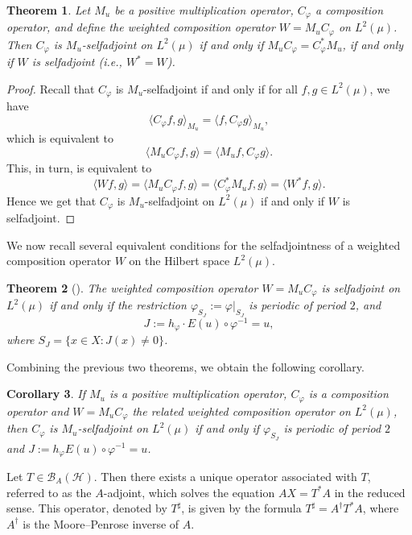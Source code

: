 \documentclass{amsart}
\newtheorem{thm}{Theorem}[section]
\newtheorem{cor}[thm]{Corollary}
\theoremstyle{definition}\newtheorem{defn}[thm]{Definition}
\theoremstyle{remark}
\numberwithin{equation}{section}
\begin{document}
\begin{thm}
Let $M_u$ be a positive multiplication operator, $C_{\varphi}$ a composition operator, and define the weighted composition operator $W = M_u C_{\varphi}$ on $L^2(\mu)$. Then $C_{\varphi}$ is $M_u$-selfadjoint on $L^2(\mu)$ if and only if $M_u C_{\varphi} = C_{\varphi}^* M_u$, if and only if $W$ is selfadjoint (i.e., $W^* = W$).
\end{thm}

\begin{proof}
Recall that $C_{\varphi}$ is $M_u$-selfadjoint if and only if for all $f, g \in L^2(\mu)$, we have
\[
\langle C_{\varphi} f, g \rangle_{M_u} = \langle f, C_{\varphi} g \rangle_{M_u},
\]
which is equivalent to
\[
\langle M_u C_{\varphi} f, g \rangle = \langle M_u f, C_{\varphi} g \rangle.
\]
This, in turn, is equivalent to
\[
\langle W f, g \rangle = \langle M_u C_{\varphi} f, g \rangle = \langle C_{\varphi}^* M_u f, g \rangle = \langle W^* f, g \rangle.
\]
Hence we get that $C_{\varphi}$ is $M_u$-selfadjoint on $L^2(\mu)$ if and only if $W$ is selfadjoint.
\end{proof}
We now recall several equivalent conditions for the selfadjointness of a weighted composition operator \( W \) on the Hilbert space \( L^2(\mu) \).


\begin{thm}[\cite{Campbell1990}]\label{t1.3}
The weighted composition operator $W = M_u C_{\varphi}$ is selfadjoint on $L^2(\mu)$ if and only if the restriction $\varphi_{S_J} := \varphi|_{S_J}$ is periodic of period $2$, and 
\[
J := h_{\varphi} \cdot E(u) \circ \varphi^{-1} = u,
\]
where $S_J = \{ x \in X : J(x) \neq 0 \}$.
\end{thm}
 Combining the previous two theorems, we obtain the following corollary.

\begin{cor}\label{c1}
If $M_u$ is a positive multiplication operator, $C_{\varphi}$ is a composition operator and $W = M_u C_{\varphi}$ the related weighted composition operator on $L^2(\mu)$, then 
$C_{\varphi}$ is $M_u$-selfadjoint on $L^2(\mu)$ if and only if $\varphi_{S_J}$ is periodic of period $2$ and $J := h_{\varphi} E(u) \circ \varphi^{-1} = u$.
\end{cor} Let $T \in \mathcal{B}_A(\mathcal{H})$. Then there exists a unique operator associated with $T$, referred to as the $A$-adjoint, which solves the equation $AX = T^*A$ in the reduced sense. This operator, denoted by $T^\sharp$, is given by the formula $T^\sharp = A^\dagger T^* A$, where $A^\dagger$ is the Moore–Penrose inverse of $A$. 
\end{document}
